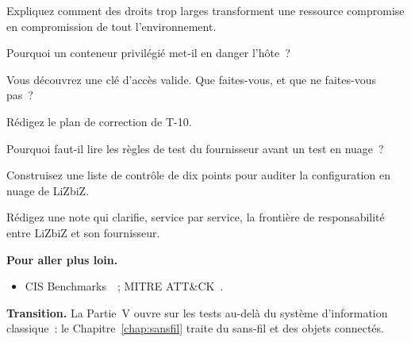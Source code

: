 \begin{boxexo}[title={\ding{45}\quad Exercice~17.4. Droits larges \niveaumoyen}]
Expliquez comment des droits trop larges transforment une ressource
compromise en compromission de tout l'environnement.
\end{boxexo}

\begin{boxexo}[title={\ding{45}\quad Exercice~17.5. Conteneur privilégié \niveaumoyen}]
Pourquoi un conteneur privilégié met-il en danger l'hôte~?
\end{boxexo}

\begin{boxexo}[title={\ding{45}\quad Exercice~17.6. Clé trouvée \niveaumoyen}]
Vous découvrez une clé d'accès valide. Que faites-vous, et que ne faites-vous
pas~?
\end{boxexo}

\begin{boxexo}[title={\ding{45}\quad Exercice~17.7. T-10 \niveaumoyen}]
Rédigez le plan de correction de T-10.
\end{boxexo}

\begin{boxexo}[title={\ding{45}\quad Exercice~17.8. Règles du fournisseur \niveaumoyen}]
Pourquoi faut-il lire les règles de test du fournisseur avant un test en
nuage~?
\end{boxexo}

\begin{boxexo}[title={\ding{45}\quad Exercice~17.9. Audit de configuration \niveauexpert}]
Construisez une liste de contrôle de dix points pour auditer la
configuration en nuage de LiZbiZ.
\end{boxexo}

\begin{boxexo}[title={\ding{45}\quad Exercice~17.10. Responsabilité \niveauexpert}]
Rédigez une note qui clarifie, service par service, la frontière de
responsabilité entre LiZbiZ et son fournisseur.
\end{boxexo}

\bigskip

\begin{boxinfo}
\textbf{Pour aller plus loin.}
\begin{itemize}
    \item CIS Benchmarks~\cite{cis2021controls}~; MITRE ATT\&CK~\cite{mitreattack}.
\end{itemize}
\end{boxinfo}

\begin{boxinfo}
\textbf{Transition.} La Partie~V ouvre sur les tests au-delà du système
d'information classique~: le Chapitre~\ref{chap:sansfil} traite du sans-fil
et des objets connectés.
\end{boxinfo}
